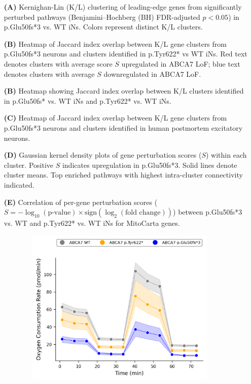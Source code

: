 \documentclass[12pt]{article}
\begin{document}
\begin{itemize}
    \item[\textbf{(A)}] Kernighan-Lin (K/L) clustering of leading-edge genes from significantly perturbed pathways (Benjamini–Hochberg (BH) FDR-adjusted $p<0.05$) in p.Glu50fs*3 vs. WT iNs. Colors represent distinct K/L clusters.
    \item[\textbf{(B)}] Heatmap of Jaccard index overlap between K/L gene clusters from p.Glu50fs*3 neurons and clusters identified in p.Tyr622* vs WT iNs. Red text denotes clusters with average score $S$ upregulated in ABCA7 LoF; blue text denotes clusters with average $S$ downregulated in ABCA7 LoF.
    \item[\textbf{(B)}] Heatmap showing Jaccard index overlap between K/L clusters identified in p.Glu50fs* vs. WT iNs and p.Tyr622* vs. WT iNs.
    \item[\textbf{(C)}] Heatmap of Jaccard index overlap between K/L gene clusters from p.Glu50fs*3 neurons and clusters identified in human postmortem excitatory neurons.
    \item[\textbf{(D)}] Gaussian kernel density plots of gene perturbation scores ($S$) within each cluster. Positive $S$ indicates upregulation in p.Glu50fs*3. Solid lines denote cluster means. Top enriched pathways with highest intra-cluster connectivity indicated.
    \item[\textbf{(E)}] Correlation of per-gene perturbation scores ($S = -\log_{10}(\text{p-value}) \times \text{sign}(\log_2(\text{fold change}))$) between p.Glu50fs*3 vs. WT and p.Tyr622* vs. WT iNs for MitoCarta genes.
\end{itemize} \begin{figure}[H]
    \begin{subfigure}[t]{0.33\textwidth}
        \caption{}
        \includegraphics[width=\textwidth]{./extended_plots/rep_seahorse_curves_by_line.png}        

\end{subfigure}
\end{figure}
\end{document}
